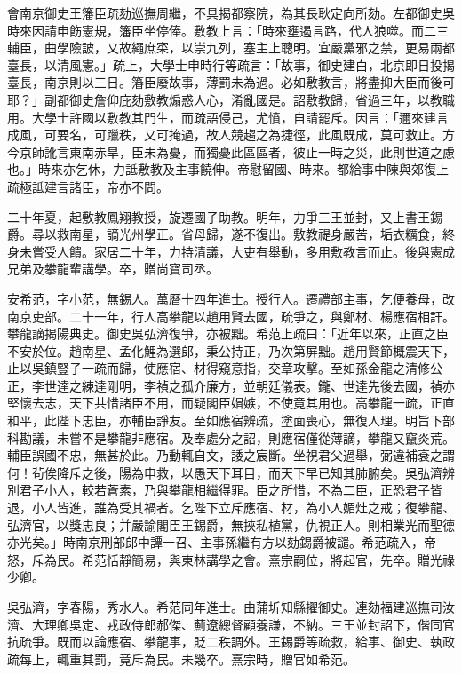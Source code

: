 \begin{pinyinscope}
會南京御史王籓臣疏劾巡撫周繼，不具揭都察院，為其長耿定向所劾。左都御史吳時來因請申飭憲規，籓臣坐停俸。敷教上言：「時來壅遏言路，代人狼噬。而二三輔臣，曲學險詖，又故繩庶寀，以崇九列，塞主上聰明。宜嚴黨邪之禁，更易兩都臺長，以清風憲。」疏上，大學士申時行等疏言：「故事，御史建白，北京即日投揭臺長，南京則以三日。籓臣廢故事，薄罰未為過。必如敷教言，將盡抑大臣而後可耶？」副都御史詹仰庇劾敷教煽惑人心，淆亂國是。詔敷教歸，省過三年，以教職用。大學士許國以敷教其門生，而疏語侵己，尤憤，自請罷斥。因言：「邇來建言成風，可要名，可躐秩，又可掩過，故人競趨之為捷徑，此風既成，莫可救止。方今京師訛言東南赤旱，臣未為憂，而獨憂此區區者，彼止一時之災，此則世道之慮也。」時來亦乞休，力詆敷教及主事饒伸。帝慰留國、時來。都給事中陳與郊復上疏極詆建言諸臣，帝亦不問。

二十年夏，起敷教鳳翔教授，旋遷國子助教。明年，力爭三王並封，又上書王錫爵。尋以救南星，謫光州學正。省母歸，遂不復出。敷教禔身嚴苦，垢衣糲食，終身未嘗受人饋。家居二十年，力持清議，大吏有舉動，多用敷教言而止。後與憲成兄弟及攀龍輩講學。卒，贈尚寶司丞。

安希范，字小范，無錫人。萬曆十四年進士。授行人。遷禮部主事，乞便養母，改南京吏部。二十一年，行人高攀龍以趙用賢去國，疏爭之，與鄭材、楊應宿相訐。攀龍謫揭陽典史。御史吳弘濟復爭，亦被黜。希范上疏曰：「近年以來，正直之臣不安於位。趙南星、孟化鯉為選郎，秉公持正，乃次第屏黜。趙用賢節概震天下，止以吳鎮豎子一疏而歸，使應宿、材得窺意指，交章攻擊。至如孫金龍之清修公正，李世達之練達剛明，李禎之孤介廉方，並朝廷儀表。鑨、世達先後去國，禎亦堅懷去志，天下共惜諸臣不用，而疑閣臣媢嫉，不使竟其用也。高攀龍一疏，正直和平，此陛下忠臣，亦輔臣諍友。至如應宿辨疏，塗面喪心，無復人理。明旨下部科勘議，未嘗不是攀龍非應宿。及奉處分之詔，則應宿僅從薄謫，攀龍又竄炎荒。輔臣誤國不忠，無甚於此。乃動輒自文，諉之宸斷。坐視君父過舉，弼違補袞之謂何！茍俟降斥之後，陽為申救，以愚天下耳目，而天下早已知其肺腑矣。吳弘濟辨別君子小人，較若蒼素，乃與攀龍相繼得罪。臣之所惜，不為二臣，正恐君子皆退，小人皆進，誰為受其禍者。乞陛下立斥應宿、材，為小人媚灶之戒；復攀龍、弘濟官，以獎忠良；并嚴諭閣臣王錫爵，無挾私植黨，仇視正人。則相業光而聖德亦光矣。」時南京刑部郎中譚一召、主事孫繼有方以劾錫爵被譴。希范疏入，帝怒，斥為民。希范恬靜簡易，與東林講學之會。熹宗嗣位，將起官，先卒。贈光祿少卿。

吳弘濟，字春陽，秀水人。希范同年進士。由蒲圻知縣擢御史。連劾福建巡撫司汝濟、大理卿吳定、戎政侍郎郝傑、薊遼總督顧養謙，不納。三王並封詔下，偕同官抗疏爭。既而以論應宿、攀龍事，貶二秩調外。王錫爵等疏救，給事、御史、執政疏每上，輒重其罰，竟斥為民。未幾卒。熹宗時，贈官如希范。


\end{pinyinscope}
